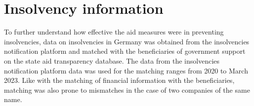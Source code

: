 
\section{Insolvency information}

To further understand how effective the aid measures were in preventing insolvencies, data on insolvencies in Germany was obtained from the insolvencies notification platform and matched with the beneficiaries of government support on the state aid transparency database. 
The data from the insolvencies notification platform data was used for the matching ranges from 2020 to March 2023. Like with the matching of financial information with the beneficiaries, matching was also prone to mismatches in the case of two companies of the same name.

